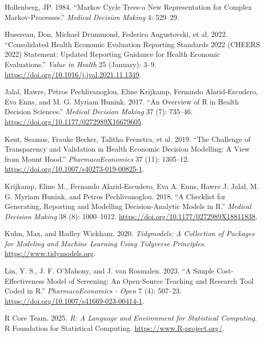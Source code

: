 \documentclass[
]{article}
\newlength{\cslhangindent}
\newenvironment{CSLReferences}[2] %
 {\begin{list}{}{%
  \setlength{\itemindent}{0pt}
  \setlength{\leftmargin}{0pt}
  \setlength{\parsep}{0pt}
  \ifodd #1
   \setlength{\leftmargin}{\cslhangindent}
   \setlength{\itemindent}{-1\cslhangindent}
  \fi
  \setlength{\itemsep}{#2\baselineskip}}}
 {\end{list}}
\begin{document}
\begin{CSLReferences}{1}{1}
Hollenberg, JP. 1984. {``Markov Cycle Trees-a New Representation for
Complex Markov-Processes.''} \emph{Medical Decision Making} 4: 529--29.

Husereau, Don, Michael Drummond, Federico Augustovski, et al. 2022.
{``Consolidated {Health} {Economic} {Evaluation} {Reporting} {Standards}
2022 ({CHEERS} 2022) {Statement}: {Updated} {Reporting} {Guidance} for
{Health} {Economic} {Evaluations}.''} \emph{Value in Health} 25
(January): 3--9. \url{https://doi.org/10.1016/j.jval.2021.11.1349}.

Jalal, Hawre, Petros Pechlivanoglou, Eline Krijkamp, Fernando
Alarid-Escudero, Eva Enns, and M. G. Myriam Hunink. 2017. {``An Overview
of {R} in Health Decision Sciences.''} \emph{Medical Decision Making} 37
(7): 735--46. \url{https://doi.org/10.1177/0272989X16679605}.

Kent, Seamus, Frauke Becker, Talitha Feenstra, et al. 2019. {``The
Challenge of Transparency and Validation in Health Economic Decision
Modelling: A View from Mount Hood.''} \emph{PharmacoEconomics} 37 (11):
1305--12. \url{https://doi.org/10.1007/s40273-019-00825-1}.

Krijkamp, Eline M., Fernando Alarid-Escudero, Eva A. Enns, Hawre J.
Jalal, M. G. Myriam Hunink, and Petros Pechlivanoglou. 2018. {``A
Checklist for Generating, Reporting and Modelling Decision-Analytic
Models in {R}.''} \emph{Medical Decision Making} 38 (8): 1000--1012.
\url{https://doi.org/10.1177/0272989X18811838}.

Kuhn, Max, and Hadley Wickham. 2020. \emph{Tidymodels: A Collection of
Packages for Modeling and Machine Learning Using Tidyverse Principles.}
\url{https://www.tidymodels.org}.

Lin, Y. S., J. F. O'Mahony, and J. van Rosmalen. 2023. {``A Simple
Cost-Effectiveness Model of Screening: An Open-Source Teaching and
Research Tool Coded in {R}.''} \emph{PharmacoEconomics - Open} 7 (4):
507--23. \url{https://doi.org/10.1007/s41669-023-00414-1}.

R Core Team. 2025. \emph{R: A Language and Environment for Statistical
Computing}. R Foundation for Statistical Computing.
\url{https://www.R-project.org/}.


\end{CSLReferences}
\end{document}
